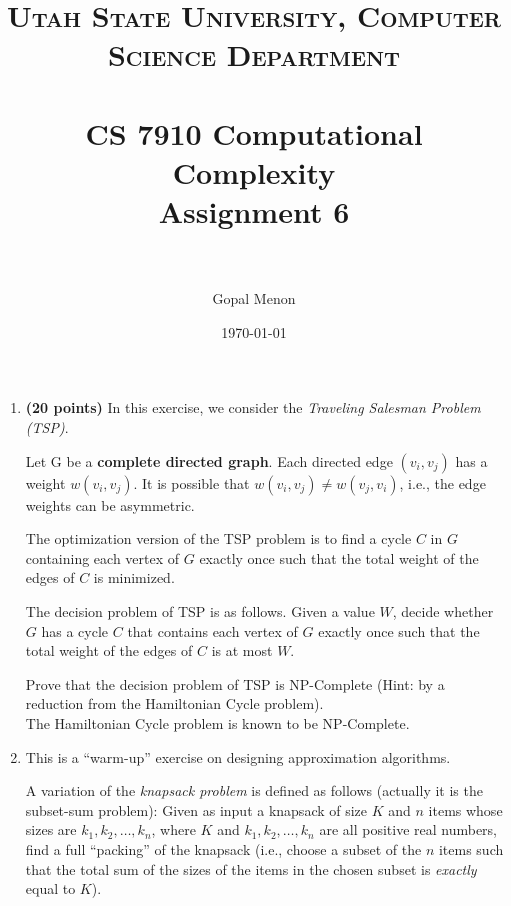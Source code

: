 \documentclass[paper=a4, fontsize=11pt]{scrartcl} %
\title{	
\normalfont \normalsize 
\textsc{Utah State University, Computer Science Department} \\ [25pt] %
\horrule{0.5pt} \\[0.4cm] %
\huge CS 7910 Computational Complexity\\Assignment 6 \\ %
\horrule{2pt} \\[0.5cm] %
}
\author{Gopal Menon} %
\date{\normalsize\today} %
\numberwithin{equation}{section} %
\numberwithin{figure}{section} %
\numberwithin{table}{section} %
\begin{document}
\maketitle %

\begin{enumerate}
\item \textbf{(20 points)} In this exercise, we consider the \emph{Traveling Salesman Problem (TSP)}.

Let G be a \textbf{complete directed graph}. Each directed edge $(v_i,v_j)$ has a weight $w(v_i,v_j)$. It is possible that $w(v_i,v_j) \neq w(v_j,v_i)$, i.e., the edge weights can be asymmetric.

The optimization version of the TSP problem is to find a cycle $C$ in $G$ containing each vertex of $G$ exactly once such that the total weight of the edges of $C$ is minimized.

The decision problem of TSP is as follows. Given a value $W$, decide whether $G$ has a cycle $C$ that contains each vertex of $G$ exactly once such that the total weight of the edges of $C$ is at most $W$.

Prove that the decision problem of TSP is NP-Complete (Hint: by a reduction from the Hamiltonian Cycle problem).\\

The Hamiltonian Cycle problem is known to be NP-Complete.

\item This is a \enquote{warm-up} exercise on designing approximation algorithms.

A variation of the \emph{knapsack problem} is defined as follows (actually it is the subset-sum problem): Given as input a knapsack of size $K$ and $n$ items whose sizes are $k_1, k_2, \ldots , k_n$, where $K$ and $k_1, k_2, \ldots , k_n$ are all positive real numbers, find a full \enquote{packing} of the knapsack (i.e., choose a subset of the $n$ items such that the total sum of the sizes of the items in the chosen subset is \emph{exactly} equal to $K$).


\end{enumerate}
\end{document}
